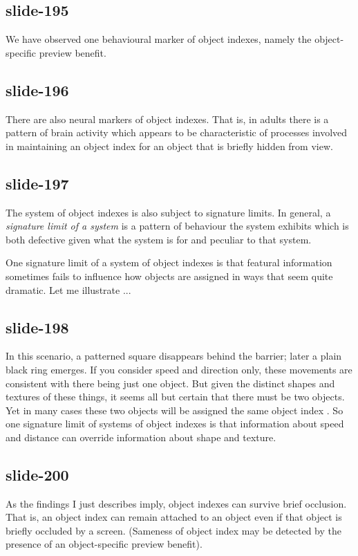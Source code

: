 \documentclass[12pt,\papersize]{extarticle}
\begin{document}
\subsection{slide-195}
We have observed one behavioural marker of object
indexes, namely the object-specific preview benefit.

\subsection{slide-196}
There are also neural markers of object indexes.
That is, in adults there is a pattern of brain activity which appears to be
characteristic of processes involved in maintaining an object index
for an object that is briefly hidden from view.

\subsection{slide-197}
The system of object indexes is also subject to signature limits.
In general, a \emph{signature limit of a system} is a pattern of behaviour the system exhibits which is both defective given what the system is for and peculiar to that system.

One signature limit of a system of object indexes is that featural information sometimes fails to influence how objects are assigned in ways that seem quite dramatic.
Let me illustrate ...

\subsection{slide-198}
In this scenario,
a patterned square disappears behind the barrier; later a plain black ring emerges.
If you consider speed and direction only, these movements are consistent with there being just one object.
But given the distinct shapes and textures of these things, it seems all but certain that there must be two objects.
Yet in many cases these two objects will be assigned the same object index \citep{flombaum:2006_temporal,mitroff:2007_space}.
So one signature limit of systems of object indexes is that information about speed and distance can override information about shape and texture.

\subsection{slide-200}
As the findings I just describes imply,
object indexes can survive brief occlusion.
That is, an object index
can remain attached to an object even if that
object is briefly occluded by a screen.
(Sameness of object index may be detected by the presence of an
object-specific preview benefit).
\end{document}

